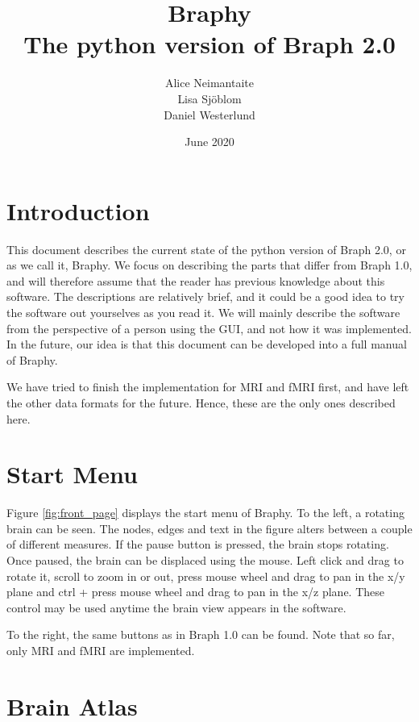 \documentclass{article}
\title{%
	Braphy \\
	\large The python version of Braph 2.0}
\author{Alice Neimantaite \\ Lisa Sjöblom \\ Daniel Westerlund}
\date{June 2020}
\begin{document}
\maketitle
\clearpage

\section{Introduction}

This document describes the current state of the python version of Braph 2.0, or as we call it, Braphy. We focus on describing the parts that differ from Braph 1.0, and will therefore assume that the reader has previous knowledge about this software. The descriptions are relatively brief, and it could be a good idea to try the software out yourselves as you read it. We will mainly describe the software from the perspective of a person using the GUI, and not how it was implemented. In the future, our idea is that this document can be developed into a full manual of Braphy.

We have tried to finish the implementation for MRI and fMRI first, and have left the other data formats for the future. Hence, these are the only ones described here.

\section{Start Menu}

Figure \ref{fig:front_page} displays the start menu of Braphy. To the left, a rotating brain can be seen. The nodes, edges and text in the figure alters between a couple of different measures. If the pause button is pressed, the brain stops rotating. Once paused, the brain can be displaced using the mouse. Left click and drag to rotate it, scroll to zoom in or out, press mouse wheel and drag to pan in the x/y plane and ctrl + press mouse wheel and drag to pan in the x/z plane. These control may be used anytime the brain view appears in the software.

To the right, the same buttons as in Braph 1.0 can be found. Note that so far, only MRI and fMRI are implemented. 

\section{Brain Atlas}
\end{document}
